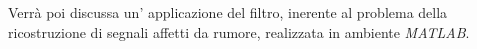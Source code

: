 \documentclass{article}
\numberwithin{equation}{section}
\begin{document}
Verrà poi discussa un' applicazione del filtro, inerente al problema della ricostruzione di segnali affetti da rumore, realizzata in ambiente \textit{MATLAB}.

\newpage















\newpage
\nocite{conti}


\end{document}
